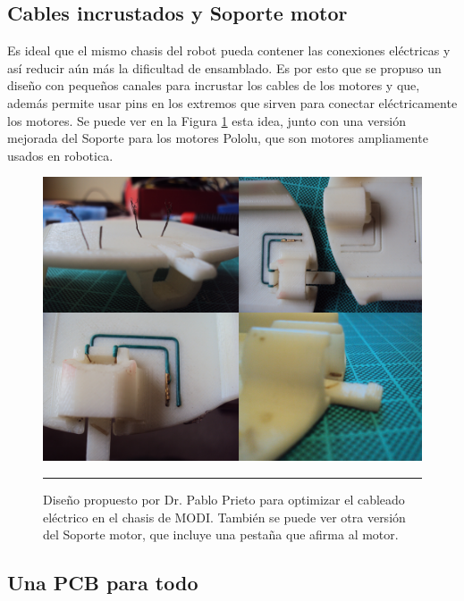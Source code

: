 \subsection{Cables incrustados y Soporte motor}
Es ideal que el mismo chasis del robot pueda contener las conexiones eléctricas y así reducir aún más la dificultad de ensamblado. Es por esto que se propuso un diseño con pequeños canales para incrustar los cables de los motores y que, además permite usar pins en los extremos que sirven para conectar eléctricamente los motores. Se puede ver en la Figura \ref{fig:Cables incrustados} esta idea, junto con una versión mejorada del Soporte para los motores Pololu, que son motores ampliamente usados en robotica.

\begin{figure}[htbp]
	\centering
		\includegraphics[width=\textwidth]{./Pictures/wires.png}
		\rule{35em}{0.5pt}
	\caption[Cables incrustados y Soporte motor]{Diseño propuesto por Dr. Pablo Prieto para optimizar el cableado eléctrico en el chasis de MODI. También se puede ver otra versión del Soporte motor, que incluye una pestaña que afirma al motor.}
	\label{fig:Cables incrustados}
\end{figure}	







\subsection{Una PCB para todo}


